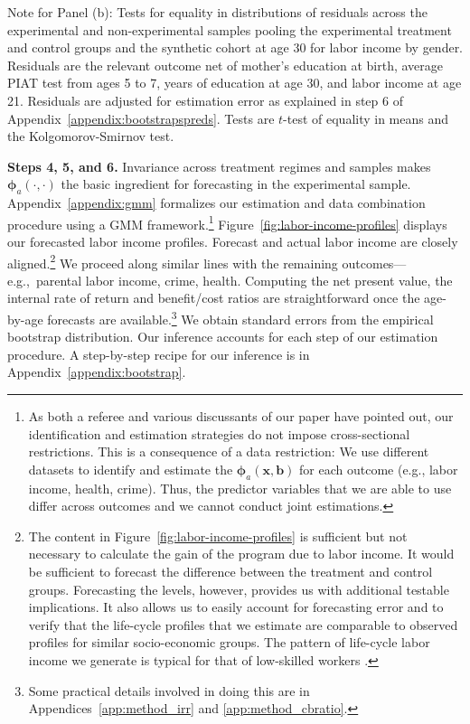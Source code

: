 \begin{table}[!htpb]
\begin{threeparttable}
\begin{tablenotes}
Note for Panel (b): Tests for equality in distributions of residuals across the experimental and non-experimental samples pooling the experimental treatment and control groups and the synthetic cohort at age 30 for labor income by gender.  Residuals are the relevant outcome net of mother's education at birth, average PIAT test from ages 5 to 7, years of education at age 30, and labor income at age 21. Residuals are adjusted for estimation error as explained in step 6 of Appendix~\ref{appendix:bootstrapspreds}. Tests are $t$-test of equality in means and the Kolgomorov-Smirnov test.\\
\end{tablenotes}
\end{threeparttable}
\end{table}

\textbf{Steps 4, 5, and 6.} \label{section:following} Invariance across treatment regimes and samples makes $\bm{\phi}_{a} (\cdot, \cdot)$ the basic ingredient for forecasting in the experimental sample. Appendix~\ref{appendix:gmm} formalizes our estimation and data combination procedure using a GMM framework.\footnote{As both a referee and various discussants of our paper have pointed out, our identification and estimation strategies do not impose cross-sectional restrictions. This is a consequence of a data restriction: We use different datasets to identify and estimate the  $\bm{\phi}_{a} \left( \bm{x}, \bm{b} \right)$ for each outcome (e.g., labor income, health, crime). Thus, the predictor variables that we are able to use differ across outcomes and we cannot conduct joint estimations.} Figure~\ref{fig:labor-income-profiles} displays our forecasted labor income profiles. Forecast and actual labor income are closely aligned.\footnote{The content in Figure~\ref{fig:labor-income-profiles} is sufficient but not necessary to calculate the gain of the program due to labor income. It would be sufficient to forecast the difference between the treatment and control groups. Forecasting the levels, however, provides us with additional testable implications. It also allows us to easily account for forecasting error and to verify that the life-cycle profiles that we estimate are comparable to observed profiles for similar socio-economic groups. The pattern of life-cycle labor income we generate is typical for that of low-skilled workers \citep{Blundell-etal_2015_J-Pub-E,Gladden_Taber_2000_WageProgression,Sanders-Taber_2012_AR,Lagakos_Moll_etal_2016_LifeCycle_NBER}.} We proceed along similar lines with the remaining outcomes---e.g.,\ parental labor income, crime, health. Computing the net present value, the internal rate of return and benefit/cost ratios are straightforward once the age-by-age forecasts are available.\footnote{Some practical details involved in doing this are in Appendices~\ref{app:method_irr} and \ref{app:method_cbratio}.} We obtain standard errors from the empirical bootstrap distribution. Our inference accounts for each step of our estimation procedure. A step-by-step recipe for our inference is in Appendix~\ref{appendix:bootstrap}.

